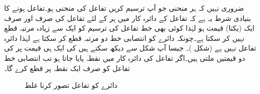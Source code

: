 ضروری نہیں کہ ہر منحنی جو آپ ترسیم کریں تفاعل کی منحنی ہو۔تفاعل ہونے کا بنیادی شرط یہ ہے کہ تفاعل کے دائرہ کار میں ہر  کے لئے تفاعل کی صرف اور صرف ایک (یکتا) قیمت  ہو لہٰذا کوئی بھی  خط تفاعل کی ترسیم کو ایک سے زیادہ مرتبہ قطع نہیں کر سکتا ہے۔چونکہ دائرے کو انتصابی خط دو مرتبہ قطع کر سکتا ہے لہٰذا  دائرہ تفاعل نہیں ہے (شکل )۔ جیسا آپ شکل  سے دیکھ سکتے ہیں  کی ایک ہی قیمت پر  کی دو قیمتیں ملتی ہیں۔اگر تفاعل  کی دائرہ کار میں نقطہ  پایا جاتا ہو تب انتصابی خط  تفاعل کو صرف ایک نقطہ  پر قطع کرے گا۔
\begin{figure}
\centering
{}
\caption{دائرے کو تفاعل تصور کرنا غلط }
\label{شکل_ابتدا_دائرہ_تفاعل_نہیں}
\end{figure}

